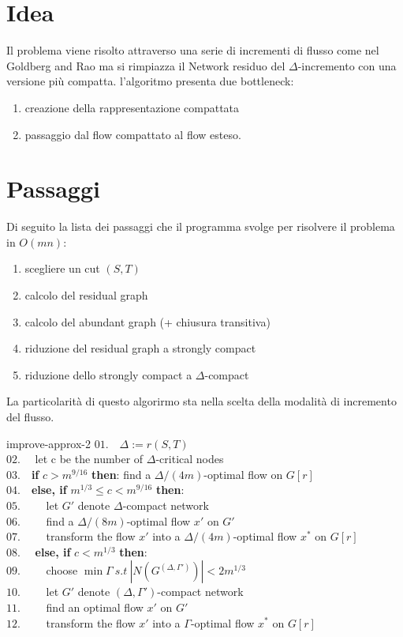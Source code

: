 \documentclass[a4paper, 11pt]{report}
\begin{document}
\section{Idea}
Il problema viene risolto attraverso una serie di incrementi di flusso come nel Goldberg and Rao ma si rimpiazza il Network residuo del $\Delta$-incremento con una versione più compatta.
l'algoritmo presenta due bottleneck: \begin{enumerate}
    \item creazione della rappresentazione compattata
    \item passaggio dal flow compattato al flow esteso.
\end{enumerate}
\section{Passaggi}

Di seguito la lista dei passaggi che il programma svolge per risolvere il problema in $O(mn)$:
\begin{enumerate}
    \item scegliere un cut $(S,T)$
    \item calcolo del residual graph
    \item calcolo del abundant graph (+ chiusura transitiva)
    \item riduzione del residual graph a strongly compact
    \item riduzione dello strongly compact a $\Delta$-compact
\end{enumerate}

La particolarità di questo algorirmo sta nella scelta della modalità di incremento del flusso.
\begin{algo}{improve-approx-2}{}
    $01.\quad \Delta := r(S,T)$\\
    $02.\quad$ let c be the number of $\Delta$-critical nodes\\
    $03.\quad$\textbf{if} $c>m^{9/16}$ \textbf{then}: find a $\Delta/(4m)$-optimal flow on $G[r]$\\
    $04.\quad$\textbf{else, if} $m^{1/3}\le c<m^{9/16}$ \textbf{then}:\\
    $05.\qquad$ let $G'$ denote $\Delta$-compact network\\
    $06.\qquad$ find a $\Delta/(8m)$-optimal flow $x'$ on $G'$\\
    $07.\qquad$ transform the flow $x'$ into a $\Delta/(4m)$-optimal flow $x^*$ on $G[r]$\\
    $08.\quad$ \textbf{else, if} $c < m^{1/3}$ \textbf{then}: \\
    $09.\qquad$ choose  $\min \Gamma\ s.t\  |N(G^{(\Delta, \Gamma')})| < 2m^{1/3}$\\
    $10.\qquad$ let $G'$ denote $(\Delta, \Gamma')$-compact network\\
    $11.\qquad$ find an optimal flow $x'$ on $G'$\\
    $12.\qquad$ transform the flow $x'$ into a $\Gamma$-optimal flow $x^*$ on $G[r]$\\

            
    
    
\end{algo}
\end{document}
